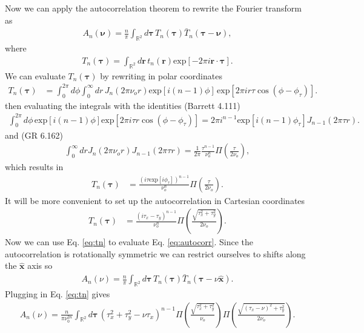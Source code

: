 \documentclass[]{osa-article}
\providecommand{\mb}[1]{\mathbf{#1}}
\providecommand{\mh}[1]{\mathbf{\hat{#1}}}
\providecommand{\mbb}[1]{\mathbb{#1}}
\providecommand{\bs}[1]{\boldsymbol{#1}}
\providecommand{\bv}{\bs{\nu}}
\begin{document}
Now we can apply the autocorrelation theorem to rewrite the Fourier transform as
\begin{align}
  A_n(\bv) = \frac{n}{\pi}\int_{\mbb{R}^2}d\bs{\tau}\, T_n(\bs{\tau})\bar{T}_n(\bs{\tau} - \bv), \label{eq:autocorr}
\end{align}
where
\begin{align}
  T_n(\bs{\tau}) = \int_{\mbb{R}^2}d\mb{r}\, t_n(\mb{r})\text{exp}\left[-2\pi i\mb{r}\cdot\bs{\tau}\right]. \label{eq:tau}
\end{align}
We can evaluate $T_n(\bs{\tau})$ by rewriting in polar coordinates
\begin{align}
  T_n(\bs{\tau}) &= \int_0^{2\pi} d\phi \int_{0}^{\infty}dr\, J_n(2\pi\nu_o r)\text{exp}[i(n-1)\phi]\, \text{exp}\left[2\pi ir\tau\cos(\phi - \phi_{\tau})\right].
\end{align}
then evaluating the integrals with the identities (Barrett 4.111)
\begin{align}
  \int_0^{2\pi} d\phi\, \text{exp}[i(n-1)\phi]\text{exp}[2\pi i \tau r\cos(\phi - \phi_\tau)] = 2\pi i^{n-1}\text{exp}[i(n-1)\phi_\tau]J_{n-1}(2\pi \tau r).
\end{align}
and (GR 6.162)
\begin{align}
  \int_0^\infty dr J_n(2\pi\nu_o r)J_{n-1}(2\pi\tau r) = \frac{1}{2\pi}\frac{\tau^{n-1}}{\nu_o^n}\Pi\left(\frac{\tau}{2\nu_o}\right),
\end{align}
which results in 
\begin{align}
  T_n(\bs{\tau}) &= \frac{(i\tau\text{exp}[i\phi_\tau])^{n-1}}{\nu_o^n}\Pi\left(\frac{\tau}{2\nu_o}\right).
\end{align}
It will be more convenient to set up the autocorrelation in Cartesian coordinates 
\begin{align}
  T_n(\bs{\tau}) &= \frac{(i\tau_x - \tau_y)^{n-1}}{\nu_o^n}\Pi\left(\frac{\sqrt{\tau_x^2 + \tau_y^2}}{2\nu_o}\right). \label{eq:tn}
\end{align}
Now we can use Eq. \ref{eq:tn} to evaluate Eq. \ref{eq:autocorr}. Since the
autocorrelation is rotationally symmetric we can restrict ourselves to shifts
along the $\mh{x}$ axis so
\begin{align}
  A_n(\nu) = \frac{n}{\pi}\int_{\mbb{R}^2}d\bs{\tau}\, T_n(\bs{\tau})\bar{T}_n(\bs{\tau} - \nu\mh{x}).
\end{align}
Plugging in Eq. \ref{eq:tn} gives
\begin{align}
  A_n(\nu) = \frac{n}{\pi \nu_0^{2n}}\int_{\mbb{R}^2}d\bs{\tau}\, (\tau_x^2 + \tau_y^2 - \nu\tau_x)^{n-1}\Pi\left(\frac{\sqrt{\tau_x^2 + \tau_y^2}}{\nu_o}\right)\Pi\left(\frac{\sqrt{(\tau_x - \nu)^2 + \tau_y^2}}{2\nu_o}\right).
\end{align}
\end{document}
